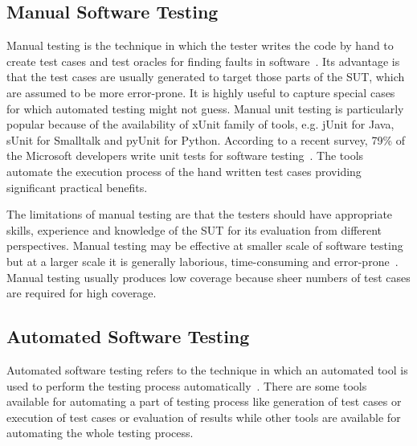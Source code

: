 
\subsection{Manual Software Testing}
Manual testing is the technique in which the tester writes the code by hand to create test cases and test oracles for finding faults in software~\cite{ciupa2008finding}. Its advantage is that the test cases are usually generated to target those parts of the SUT, which are assumed to be more error-prone. It is highly useful to capture special cases for which automated testing might not guess. Manual unit testing is particularly popular because of the availability of xUnit family of tools, e.g. jUnit for Java, sUnit for Smalltalk and pyUnit for Python. According to a recent survey, 79\% of the Microsoft developers write unit tests for software testing~\cite{leitner2009effectiveness}. The tools automate the execution process of the hand written test cases providing significant practical benefits.  

The limitations of manual testing are that the testers should have appropriate skills, experience and knowledge of the SUT for its evaluation from different perspectives. Manual testing may be effective at smaller scale of software testing but at a larger scale it is generally laborious, time-consuming and error-prone~\cite{tretmans2000automatic}. Manual testing usually produces low coverage because sheer numbers of test cases are required for high coverage.


 
\subsection{Automated Software Testing}
Automated software testing refers to the technique in which an automated tool is used to perform the testing process automatically~\cite{leitner2007reconciling}. There are some tools available for automating a part of testing process like generation of test cases or execution of test cases or evaluation of results while other tools are available for automating the whole testing process. 

